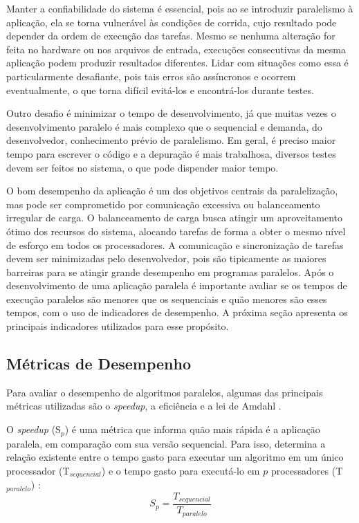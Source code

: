 Manter a confiabilidade do sistema é essencial, pois ao se introduzir paralelismo à aplicação, ela se torna vulnerável às condições de corrida, cujo resultado pode depender da ordem de execução das tarefas. Mesmo se nenhuma alteração for feita no hardware ou nos arquivos de entrada, execuções consecutivas da mesma aplicação podem produzir resultados diferentes. Lidar com situações como essa é particularmente desafiante, pois tais erros são assíncronos e ocorrem eventualmente, o que torna difícil evitá-los e encontrá-los durante testes.

Outro desafio é minimizar o tempo de desenvolvimento, já que muitas vezes o desenvolvimento paralelo é mais complexo que o sequencial e demanda, do desenvolvedor, conhecimento prévio de paralelismo. Em geral, é preciso maior tempo para escrever o código e a depuração é mais trabalhosa, 	diversos testes devem ser feitos no sistema, o que pode dispender maior tempo.

O bom desempenho da aplicação é um dos objetivos centrais da paralelização, mas pode ser comprometido por comunicação excessiva ou balanceamento irregular de carga. O balanceamento de carga busca atingir um aproveitamento ótimo dos recursos do sistema, alocando tarefas de forma a obter o mesmo nível de esforço em todos os processadores.  A comunicação e sincronização de tarefas devem ser minimizadas pelo desenvolvedor, pois são tipicamente as maiores barreiras para se atingir grande desempenho em programas paralelos.
Após o desenvolvimento de uma aplicação paralela é importante avaliar se os tempos de execução paralelos são menores que os sequenciais e quão menores são esses tempos, com o uso de indicadores de desempenho. A próxima seção apresenta os principais indicadores utilizados para esse propósito.  

\subsection{Métricas de Desempenho}

Para avaliar o desempenho de algoritmos paralelos, algumas das principais métricas utilizadas são o \textit{speedup}, a eficiência e a lei de Amdahl \cite{Rauber:2010, Breshears:2009}.

O \textit{speedup} (S$_p$) é uma métrica que informa quão mais rápida é a aplicação paralela, em comparação com sua versão sequencial. Para isso, determina a relação existente entre o tempo gasto para executar um algoritmo  em um único processador (T$_{sequencial}$) e o tempo gasto para executá-lo em $p$ processadores (T$_{paralelo}$) \cite{Rauber:2010}: 
\[ S_p = \frac{T_{sequencial}}{T_{paralelo}} \]	


